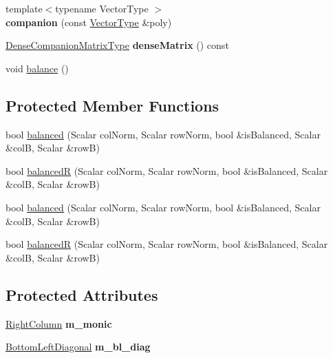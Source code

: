 \begin{DoxyCompactItemize}
\item 
\mbox{\label{class_eigen_1_1internal_1_1companion_a83f785c9dd58c7733ed37a962e618b59}} 
{\footnotesize template$<$typename Vector\+Type $>$ }\\{\bfseries companion} (const \hyperlink{struct_vector_type}{Vector\+Type} \&poly)
\item 
\mbox{\label{class_eigen_1_1internal_1_1companion_ad1708946cec9972b8347aa47b72302f2}} 
\hyperlink{group___core___module_class_eigen_1_1_matrix}{Dense\+Companion\+Matrix\+Type} {\bfseries dense\+Matrix} () const
\item 
void \hyperlink{class_eigen_1_1internal_1_1companion_a7362d054f04f6d554fb6c8a279287000}{balance} ()
\end{DoxyCompactItemize}
\subsection*{Protected Member Functions}
\begin{DoxyCompactItemize}
\item 
bool \hyperlink{class_eigen_1_1internal_1_1companion_ac5c7b024fdd218ea68165bd948f48e83}{balanced} (Scalar col\+Norm, Scalar row\+Norm, bool \&is\+Balanced, Scalar \&colB, Scalar \&rowB)
\item 
bool \hyperlink{class_eigen_1_1internal_1_1companion_a9945fcaca89aecc2fbff0e9b06510de0}{balancedR} (Scalar col\+Norm, Scalar row\+Norm, bool \&is\+Balanced, Scalar \&colB, Scalar \&rowB)
\item 
bool \hyperlink{class_eigen_1_1internal_1_1companion_ac5c7b024fdd218ea68165bd948f48e83}{balanced} (Scalar col\+Norm, Scalar row\+Norm, bool \&is\+Balanced, Scalar \&colB, Scalar \&rowB)
\item 
bool \hyperlink{class_eigen_1_1internal_1_1companion_a9945fcaca89aecc2fbff0e9b06510de0}{balancedR} (Scalar col\+Norm, Scalar row\+Norm, bool \&is\+Balanced, Scalar \&colB, Scalar \&rowB)
\end{DoxyCompactItemize}
\subsection*{Protected Attributes}
\begin{DoxyCompactItemize}
\item 
\mbox{\label{class_eigen_1_1internal_1_1companion_a864db74e59b4ea649de5078a10f60881}} 
\hyperlink{group___core___module}{Right\+Column} {\bfseries m\+\_\+monic}
\item 
\mbox{\label{class_eigen_1_1internal_1_1companion_ae2665afb531c1fe81e018c41c582db4f}} 
\hyperlink{group___core___module}{Bottom\+Left\+Diagonal} {\bfseries m\+\_\+bl\+\_\+diag}
\end{DoxyCompactItemize}


